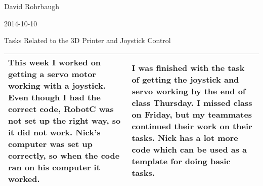 David Rohrbaugh

2014-10-10

Tasks Related to the 3D Printer and Joystick Control

\begin{tabular}{|p{5cm}|p{5cm}|}
 \hline
 This week I worked on getting a servo motor working with a joystick. Even though I had the correct code, RobotC was not set up the right way, so it did not work. Nick's computer was set up correctly, so when the code ran on his computer it worked.
 &
 I was finished with the task of getting the joystick and servo working by the end of class Thursday. I missed class on Friday, but my teammates continued their work on their tasks. Nick has a lot more code which can be used as a template for doing basic tasks.
 \\
 \hline
\end{tabular}
